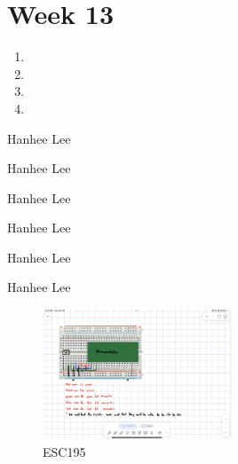 \documentclass{article}
\begin{document}
    \section{Week 13}

\begin{process}
    \begin{enumerate}
        \item 
        \item 
        \item 
        \item 
    \end{enumerate}
\end{process}

\begin{example}
    Hanhee Lee
\end{example}

\begin{definition}
    
\end{definition}

\begin{theorem}
    Hanhee Lee
\end{theorem}

\begin{derivation}
    Hanhee Lee
\end{derivation}

\begin{intuition}
    Hanhee Lee
\end{intuition}

\begin{warning}
    Hanhee Lee
\end{warning}

\begin{summary}
    Hanhee Lee
\end{summary}

\begin{figure}[H]
    \centering
    \includegraphics[width=0.5\textwidth]{00_Images/diagram_circuit.png}
    \caption{ESC195}
\end{figure}
\end{document}
